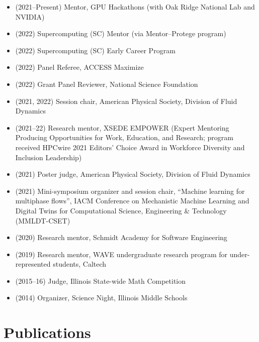 \begin{itemize}
    \item (2021--Present) Mentor, GPU Hackathons (with Oak Ridge National Lab and NVIDIA)
    \item (2022) Supercomputing (SC) Mentor (via Mentor--Protege program)
    \item (2022) Supercomputing (SC) Early Career Program
    \item (2022) Panel Referee, ACCESS Maximize
    \item (2022) Grant Panel Reviewer, National Science Foundation
    \item (2021, 2022) Session chair, American Physical Society, Division of Fluid Dynamics
    \item (2021--22) Research mentor, XSEDE EMPOWER (Expert Mentoring Producing Opportunities for Work, Education, and Research; program received HPCwire 2021 Editors' Choice Award in Workforce Diversity and Inclusion Leadership)
    \item (2021) Poster judge, American Physical Society, Division of Fluid Dynamics
    \item (2021) Mini-symposium organizer and session chair, ``Machine learning for multiphase flows'', IACM Conference on Mechanistic Machine Learning and Digital Twins for Computational Science, Engineering \& Technology (MMLDT-CSET)
    \item (2020) Research mentor, Schmidt Academy for Software Engineering
    \item (2019) Research mentor, WAVE undergraduate research program for under-represented students, Caltech
    \item (2015--16) Judge, Illinois State-wide Math Competition
    \item (2014) Organizer, Science Night, Illinois Middle Schools
\end{itemize}

\section{Publications}

\nocite{*}

\newrefcontext[labelprefix=P]
\printbibliography[type=unpublished,title={Preprints},resetnumbers=true,heading=subbibnumbered]

\newrefcontext[labelprefix=J]
\printbibliography[type=article,title={Journal papers},resetnumbers=true,heading=subbibnumbered]

\newrefcontext[labelprefix=C]
\printbibliography[type=inproceedings,title={Refereed conference papers},resetnumbers=true,heading=subbibnumbered]

